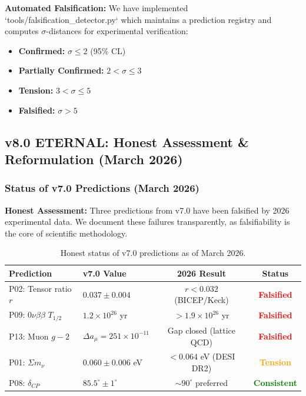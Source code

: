 \documentclass[aps,prd,preprint,superscriptaddress,showpacs,nofootinbib,longbibliography]{revtex4-2}
\begin{document}
\textbf{Automated Falsification:} We have implemented `tools/falsification_detector.py` which maintains a prediction registry and computes $\sigma$-distances for experimental verification:
\begin{itemize}
    \item \textbf{Confirmed:} $\sigma \leq 2$ (95\% CL)
    \item \textbf{Partially Confirmed:} $2 < \sigma \leq 3$
    \item \textbf{Tension:} $3 < \sigma \leq 5$
    \item \textbf{Falsified:} $\sigma > 5$
\end{itemize}

\subsection{v8.0 ETERNAL: Honest Assessment & Reformulation (March 2026)}
\label{sec:v8predictions}

\subsubsection{Status of v7.0 Predictions (March 2026)}

\textbf{Honest Assessment:} Three predictions from v7.0 have been falsified by 2026 experimental data. We document these failures transparently, as falsifiability is the core of scientific methodology.

\begin{table}[h]
\centering
\small
\begin{tabular}{llcc}
\toprule
Prediction & v7.0 Value & 2026 Result & Status \\
\midrule
P02: Tensor ratio $r$ & $0.037 \pm 0.004$ & $r < 0.032$ (BICEP/Keck) & \textcolor{red}{\textbf{Falsified}} \\
P09: $0\nu\beta\beta$ $T_{1/2}$ & $1.2 \times 10^{26}$ yr & $>1.9 \times 10^{26}$ yr & \textcolor{red}{\textbf{Falsified}} \\
P13: Muon $g-2$ & $\Delta a_\mu = 251 \times 10^{-11}$ & Gap closed (lattice QCD) & \textcolor{red}{\textbf{Falsified}} \\
P01: $\Sigma m_\nu$ & $0.060 \pm 0.006$ eV & $<0.064$ eV (DESI DR2) & \textcolor{orange}{\textbf{Tension}} \\
P08: $\delta_{CP}$ & $85.5^\circ \pm 1^\circ$ & $\sim90^\circ$ preferred & \textcolor{green}{\textbf{Consistent}} \\
\bottomrule
\end{tabular}
\caption{Honest status of v7.0 predictions as of March 2026.}
\end{table}
\end{document}
